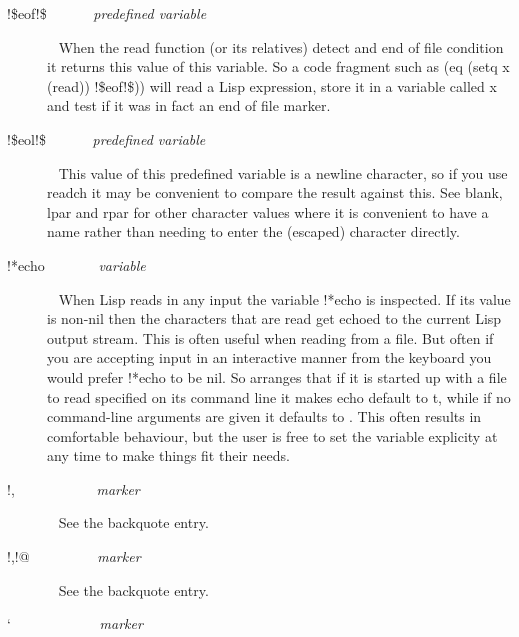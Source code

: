 \begin{description}
\item[{\tx !\$eof!\$~~~~~~} \hspace{1cm} {\em predefined variable}]~\newline
When the {\tx read} function (or its relatives) detect and end of file
condition it returns this value of this variable. So a code fragment such as
{\tx (eq (setq x (read)) !\$eof!\$))} will read a Lisp expression,
store it in a variable called {\tx x} and test if it was in fact
an end of file marker.
\item[{\tx !\$eol!\$~~~~~~} \hspace{1cm} {\em predefined variable}]~\newline
This value of this predefined variable is a newline character, so if you
use {\tx readch} it may be convenient to compare the result against this.
See {\tx blank}, {\tx lpar} and {\tx rpar} for other character values where
it is convenient to have a name rather than needing to enter the (escaped)
character directly.
\item[{\tx !*echo~~~~~~~} \hspace{1cm} {\em variable}]~\newline
When Lisp reads in any input the variable {\tx !*echo} is inspected. If
its value is non-nil then the characters that are read get echoed to the
current Lisp output stream. This is often useful when reading from a file. But
often if you are accepting input in an interactive manner from the keyboard
you would prefer {\tx !*echo} to be {\tx nil}. So \vsl{} arranges that if
it is started up with a file to read specified on its command line it
makes {\tx echo} default to {\tx t}, while if no command-line arguments are
given it defaults to \nil. This often results in comfortable behaviour, but
the user is free to set the variable explicity at any time to make things
fit their needs.
\item[{\tx !,~~~~~~~~~~~} \hspace{1cm} {\em marker}]~\newline
See the backquote entry.
\item[{\tx !,!@~~~~~~~~~} \hspace{1cm} {\em marker}]~\newline
See the backquote entry.
\item[{\tx `~~~~~~~~~~~~} \hspace{1cm} {\em marker}]~\newline

\end{description}
